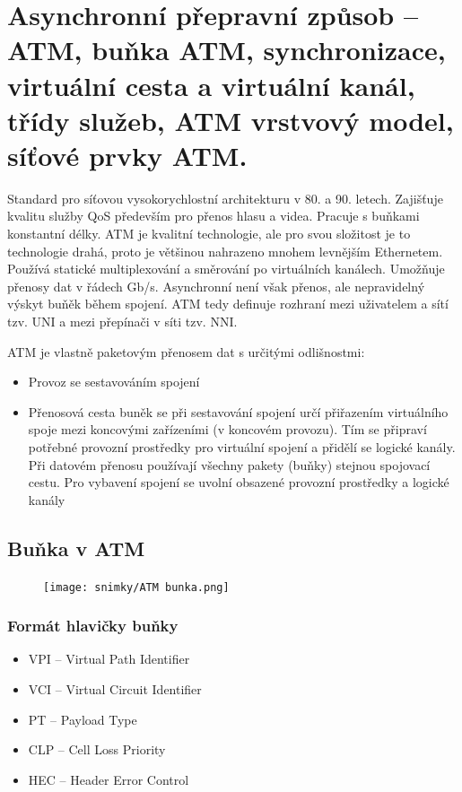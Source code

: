 \clearpage
\section{Asynchronní přepravní způsob -- ATM, buňka ATM, synchronizace, virtuální cesta a virtuální kanál, třídy služeb, ATM vrstvový model, síťové prvky ATM.}

Standard pro síťovou vysokorychlostní architekturu v 80. a 90. letech. Zajišťuje kvalitu služby QoS především pro přenos hlasu a videa. Pracuje s buňkami konstantní délky. ATM je kvalitní technologie, ale pro svou složitost je to technologie drahá, proto je většinou nahrazeno mnohem levnějším Ethernetem. Používá statické multiplexování a směrování po virtuálních kanálech. Umožňuje přenosy dat v řádech Gb/s. Asynchronní není však přenos, ale nepravidelný výskyt buňěk během spojení. ATM tedy definuje rozhraní mezi uživatelem a sítí tzv. UNI a mezi přepínači v síti tzv. NNI.

ATM je vlastně paketovým přenosem dat s určitými odlišnostmi:
\begin{itemize}
    \item Provoz se sestavováním spojení
    \item Přenosová cesta buněk se při sestavování spojení určí přiřazením virtuálního spoje mezi koncovými zařízeními (v koncovém provozu). Tím se připraví potřebné provozní prostředky pro virtuální spojení a přidělí se logické kanály. Při datovém přenosu používají všechny pakety (buňky) stejnou spojovací cestu. Pro vybavení spojení se uvolní obsazené provozní prostředky a logické kanály
\end{itemize}

\subsection{Buňka v ATM}
\begin{figure} [h]
    \centering
    \texttt{[image: snimky/ATM bunka.png]}
    \label{fig:atm-bunka}
\end{figure}

\subsubsection{Formát hlavičky buňky}
\begin{itemize}
    \item VPI -- Virtual Path Identifier
    \item VCI -- Virtual Circuit Identifier
    \item PT -- Payload Type
    \item CLP -- Cell Loss Priority
    \item HEC -- Header Error Control
\end{itemize}

